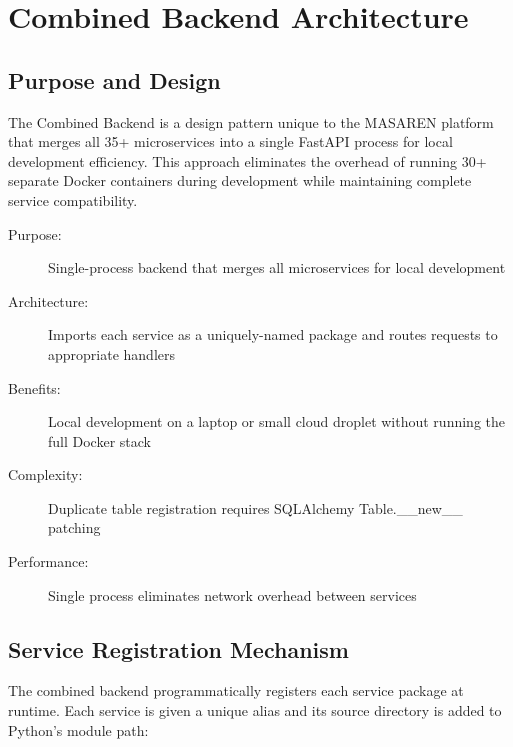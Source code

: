 \documentclass[11pt,a4paper]{article}
\begin{document}
\clearpage

\section{Combined Backend Architecture}

\subsection{Purpose and Design}

The Combined Backend is a design pattern unique to the MASAREN platform that merges all 35+ microservices into a single FastAPI process for local development efficiency. This approach eliminates the overhead of running 30+ separate Docker containers during development while maintaining complete service compatibility.

\begin{description}
  \item[Purpose:] Single-process backend that merges all microservices for local development
  \item[Architecture:] Imports each service as a uniquely-named package and routes requests to appropriate handlers
  \item[Benefits:] Local development on a laptop or small cloud droplet without running the full Docker stack
  \item[Complexity:] Duplicate table registration requires SQLAlchemy Table.\_\_new\_\_ patching
  \item[Performance:] Single process eliminates network overhead between services
\end{description}

\subsection{Service Registration Mechanism}

The combined backend programmatically registers each service package at runtime. Each service is given a unique alias and its source directory is added to Python's module path:
\end{document}
